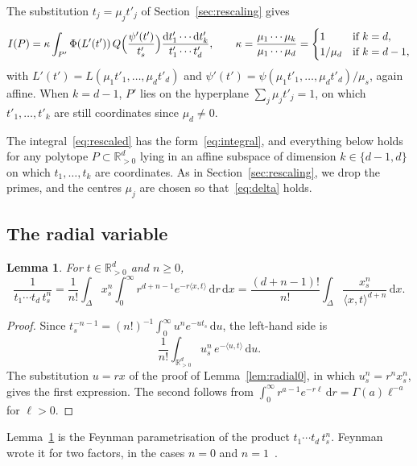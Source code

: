 \documentclass[11pt]{article}
\newtheorem{lemma}[theorem]{Lemma}
\theoremstyle{remark}
\newcommand{\R}{\mathbb{R}}
\newcommand{\scal}[2]{\langle #1, #2\rangle}
\newcommand{\dd}{\mathrm{d}}
\begin{document}
The substitution $t_j = \mu_j t'_j$ of Section~\ref{sec:rescaling} gives
\begin{equation}\label{eq:rescaled}
  I(P) = \kappa \int_{P'} \Phi(L'(t')) \,
  Q\Bigl(\frac{\psi'(t')}{t'_s}\Bigr)
  \frac{\dd t'_1 \cdots \dd t'_k}{t'_1 \cdots t'_d},
  \qquad
  \kappa = \frac{\mu_1 \cdots \mu_k}{\mu_1 \cdots \mu_d} =
  \begin{cases} 1 & \text{if } k = d, \\ 1/\mu_d & \text{if } k = d - 1,
  \end{cases}
\end{equation}
with $L'(t') = L(\mu_1 t'_1, \ldots, \mu_d t'_d)$ and $\psi'(t') =
\psi(\mu_1 t'_1, \ldots, \mu_d t'_d)/\mu_s$, again affine. When $k = d - 1$,
$P'$ lies on the hyperplane $\sum_j \mu_j t'_j = 1$, on which $t'_1, \ldots,
t'_k$ are still coordinates since $\mu_d \neq 0$.

The integral~\eqref{eq:rescaled} has the form~\eqref{eq:integral}, and
everything below holds for any polytope $P \subset \R_{>0}^d$ lying in an
affine subspace of dimension $k \in \{d - 1, d\}$ on which $t_1, \ldots,
t_k$ are coordinates. As in Section~\ref{sec:rescaling}, we drop the primes,
and the centres $\mu_j$ are chosen so that~\eqref{eq:delta} holds.

\subsection{The radial variable}

\begin{lemma}\label{lem:radial}
For $t \in \R_{>0}^d$ and $n \geq 0$,
\[
  \frac{1}{t_1 \cdots t_d \, t_s^n}
  = \frac{1}{n!} \int_\Delta x_s^n \int_0^\infty r^{d+n-1}
    e^{-r \scal{x}{t}} \, \dd r \, \dd x
  = \frac{(d+n-1)!}{n!} \int_\Delta \frac{x_s^n}{\scal{x}{t}^{d+n}} \, \dd x.
\]
\end{lemma}

\begin{proof}
Since $t_s^{-n-1} = (n!)^{-1} \int_0^\infty u^n e^{-u t_s} \, \dd u$, the
left-hand side is
\[
  \frac{1}{n!} \int_{\R_{>0}^d} u_s^n \, e^{-\scal{u}{t}} \, \dd u.
\]
The substitution $u = r x$ of the proof of Lemma~\ref{lem:radial0}, in
which $u_s^n = r^n x_s^n$, gives the first expression. The second follows
from $\int_0^\infty r^{a-1} e^{-r\ell} \, \dd r = \Gamma(a) \ell^{-a}$ for
$\ell > 0$.
\end{proof}

Lemma~\ref{lem:radial} is the Feynman parametrisation of the product $t_1
\cdots t_d \, t_s^n$. Feynman wrote it for two factors, in the cases $n =
0$ and $n = 1$~\cite[Appendix, (14a) and (15a)]{Feynman}.
\end{document}
